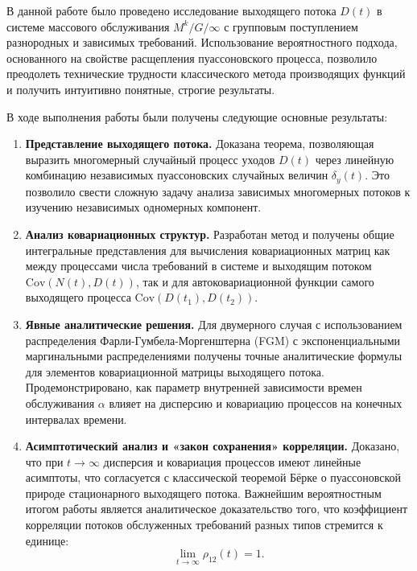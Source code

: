 \documentclass[12pt]{article}
\theoremstyle{plain}
\theoremstyle{definition}
\theoremstyle{remark}
\begin{document}
В данной работе было проведено исследование выходящего потока $D(t)$ в системе массового обслуживания $M^k/G/\infty$ с групповым поступлением разнородных и зависимых требований. Использование вероятностного подхода, основанного на свойстве расщепления пуассоновского процесса, позволило преодолеть технические трудности классического метода производящих функций и получить интуитивно понятные, строгие результаты.

В ходе выполнения работы были получены следующие основные результаты:

\begin{enumerate}
    \item \textbf{Представление выходящего потока.} Доказана теорема, позволяющая выразить многомерный случайный процесс уходов $D(t)$ через линейную комбинацию независимых пуассоновских случайных величин $\delta_y(t)$. Это позволило свести сложную задачу анализа зависимых многомерных потоков к изучению независимых одномерных компонент.
    
    \item \textbf{Анализ ковариационных структур.} Разработан метод и получены общие интегральные представления для вычисления ковариационных матриц как между процессами числа требований в системе и выходящим потоком $\mathrm{Cov} (N(t), D(t))$, так и для автоковариационной функции самого выходящего процесса \protect \newline $\mathrm{Cov} (D(t_1), D(t_2))$.
    
    \item \textbf{Явные аналитические решения.} Для двумерного случая с использованием распределения Фарли-Гумбела-Моргенштерна (FGM) с экспоненциальными маргинальными распределениями получены точные аналитические формулы для элементов ковариационной матрицы выходящего потока. Продемонстрировано, как параметр внутренней зависимости времен обслуживания $\alpha$ влияет на дисперсию и ковариацию процессов на конечных интервалах времени.
    
    \item \textbf{Асимптотический анализ и «закон сохранения» корреляции.} Доказано, что при $t \to \infty$ дисперсия и ковариация процессов имеют линейные асимптоты, что согласуется с классической теоремой Бёрке о пуассоновской природе стационарного выходящего потока. Важнейшим вероятностным итогом работы является аналитическое доказательство того, что коэффициент корреляции потоков обслуженных требований разных типов стремится к единице:
    $$ \lim_{t \to \infty} \rho_{12}(t) = 1. $$
\end{enumerate}
\end{document}
